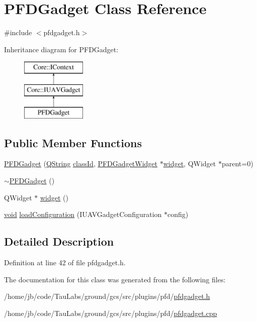 \hypertarget{class_p_f_d_gadget}{\section{\-P\-F\-D\-Gadget \-Class \-Reference}
\label{class_p_f_d_gadget}
}


{\ttfamily \#include $<$pfdgadget.\-h$>$}

\-Inheritance diagram for \-P\-F\-D\-Gadget\-:\begin{figure}[H]
\begin{center}
\leavevmode
\includegraphics[height=3.000000cm]{class_p_f_d_gadget}
\end{center}
\end{figure}
\subsection*{\-Public \-Member \-Functions}
\begin{DoxyCompactItemize}
\item 
\hyperlink{group___p_f_d_plugin_ga64f9ebd08e8c35c1b7b034f1e2ffe9bc}{\-P\-F\-D\-Gadget} (\hyperlink{group___u_a_v_objects_plugin_gab9d252f49c333c94a72f97ce3105a32d}{\-Q\-String} \hyperlink{group___core_plugin_ga3878fde66a57220608960bcc3fbeef2c}{class\-Id}, \hyperlink{class_p_f_d_gadget_widget}{\-P\-F\-D\-Gadget\-Widget} $\ast$\hyperlink{group___p_f_d_plugin_ga61807d4db8adc6952197c390f73bfcda}{widget}, \-Q\-Widget $\ast$parent=0)
\item 
\hyperlink{group___p_f_d_plugin_ga8c86763f729f03d070b2fed80bbc36ea}{$\sim$\-P\-F\-D\-Gadget} ()
\item 
\-Q\-Widget $\ast$ \hyperlink{group___p_f_d_plugin_ga61807d4db8adc6952197c390f73bfcda}{widget} ()
\item 
\hyperlink{group___u_a_v_objects_plugin_ga444cf2ff3f0ecbe028adce838d373f5c}{void} \hyperlink{group___p_f_d_plugin_ga2789c1f4ec7af3eff76f4e84551d4fe5}{load\-Configuration} (\-I\-U\-A\-V\-Gadget\-Configuration $\ast$config)
\end{DoxyCompactItemize}


\subsection{\-Detailed \-Description}


\-Definition at line 42 of file pfdgadget.\-h.



\-The documentation for this class was generated from the following files\-:\begin{DoxyCompactItemize}
\item 
/home/jb/code/\-Tau\-Labs/ground/gcs/src/plugins/pfd/\hyperlink{pfdgadget_8h}{pfdgadget.\-h}\item 
/home/jb/code/\-Tau\-Labs/ground/gcs/src/plugins/pfd/\hyperlink{pfdgadget_8cpp}{pfdgadget.\-cpp}\end{DoxyCompactItemize}

